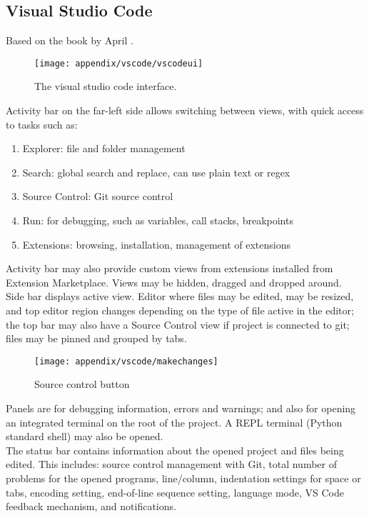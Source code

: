 \subsection{Visual Studio Code}

Based on the book by April \cite{speight_2020}.

\begin{figure}[H]
\centering
\texttt{[image: appendix/vscode/vscodeui]}
\caption{The visual studio code interface.}
\end{figure}

Activity bar on the far-left side allows switching between views, with quick access to tasks such as:
\begin{enumerate}[label=\roman*.]
\setlength{\itemsep}{0pt}
\item Explorer: file and folder management
\item Search: global search and replace, can use plain text or regex
\item Source Control: Git source control
\item Run: for debugging, such as variables, call stacks, breakpoints
\item Extensions: browsing, installation, management of extensions
\end{enumerate}
Activity bar may also provide custom views from extensions installed from Extension Marketplace. Views may be hidden, dragged and dropped around.\\

Side bar displays active view. Editor where files may be edited, may be resized, and top editor region changes depending on the type of file active in the editor; the top bar may also have a Source Control view if project is connected to git; files may be pinned and grouped by tabs.

\begin{figure}[H]
\centering
\texttt{[image: appendix/vscode/makechanges]}
\caption{Source control button}
\end{figure}

Panels are for debugging information, errors and warnings; and also for opening an integrated terminal on the root of the project. A REPL terminal (Python standard shell) may also be opened.\\

The status bar contains information about the opened project and files being edited. This includes: source control management with Git, total number of problems for the opened programs, line/column, indentation settings for space or tabs, encoding setting, end-of-line sequence setting, language mode, VS Code feedback mechanism, and notifications.\\

